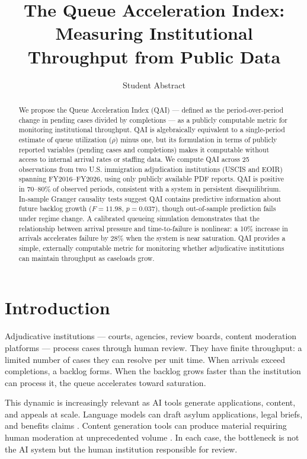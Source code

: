 \documentclass{article}
\title{The Queue Acceleration Index: Measuring Institutional Throughput from Public Data}
\author{Student Abstract}
\affiliation{Affiliation}
\begin{document}
\maketitle

\begin{abstract}
We propose the Queue Acceleration Index (QAI) — defined as the period-over-period change in pending cases divided by completions — as a publicly computable metric for monitoring institutional throughput. QAI is algebraically equivalent to a single-period estimate of queue utilization ($\rho$) minus one, but its formulation in terms of publicly reported variables (pending cases and completions) makes it computable without access to internal arrival rates or staffing data. We compute QAI across 25 observations from two U.S. immigration adjudication institutions (USCIS and EOIR) spanning FY2016--FY2026, using only publicly available PDF reports. QAI is positive in 70--80\% of observed periods, consistent with a system in persistent disequilibrium. In-sample Granger causality tests suggest QAI contains predictive information about future backlog growth ($F=11.98$, $p=0.037$), though out-of-sample prediction fails under regime change. A calibrated queueing simulation demonstrates that the relationship between arrival pressure and time-to-failure is nonlinear: a 10\% increase in arrivals accelerates failure by 28\% when the system is near saturation. QAI provides a simple, externally computable metric for monitoring whether adjudicative institutions can maintain throughput as caseloads grow.
\end{abstract}

\section{Introduction}

Adjudicative institutions — courts, agencies, review boards, content moderation platforms — process cases through human review. They have finite throughput: a limited number of cases they can resolve per unit time. When arrivals exceed completions, a backlog forms. When the backlog grows faster than the institution can process it, the queue accelerates toward saturation.

This dynamic is increasingly relevant as AI tools generate applications, content, and appeals at scale. Language models can draft asylum applications, legal briefs, and benefits claims \cite{chin-rothmann2024}. Content generation tools can produce material requiring human moderation at unprecedented volume \cite{eu-dsa2022}. In each case, the bottleneck is not the AI system but the human institution responsible for review.
\end{document}
